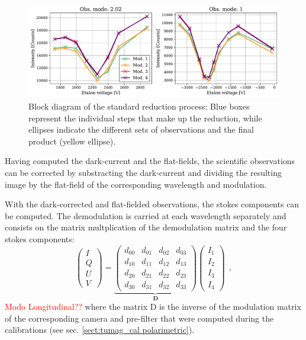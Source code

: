 \begin{figure}[t]
  \includegraphics[width=\textwidth]{figures/Pipeline/Spectral_scans_ecample.pdf}
  \caption{
    Block diagram of the standard reduction process: Blue boxes represent the individual steps that make up the reduction, while ellipses indicate the different sets of observations and the final product (yellow ellipse). }
    \label{fig_pipeline: spectral_scans}
\end{figure}


Having computed the dark-current and the flat-fields, the scientific observations can be corrected by substracting the dark-current and dividing the resulting image by the flat-field of the corresponding wavelength and modulation. 

With the dark-corrected and flat-fielded observations, the stokes components can be computed. The demodulation is carried at each wavelength separately and consists on the matrix multplication of the demodulation matrix and the four stokes components:
\begin{equation}
  \begin{pmatrix}
  I \\
  Q \\
  U \\
  V
  \end{pmatrix} = 
  \underbrace{\begin{pmatrix} 
      d _ {00} & d _ {01} & d _ {02} & d _ {03} \\ 
      d _ {10} & d _ {11} & d _ {12} & d _ {13} \\
      d _ {20} & d _ {21} & d _ {22} & d _ {23} \\
      d _ {30} & d _ {31} & d _ {32} & d _ {33} 
  \end{pmatrix}}_ {\textbf{D}}
  \begin{pmatrix}
    I _ {1} \\
    I _ {2} \\
    I _ {3} \\
    I _ {4}
    \end{pmatrix} \ \ , 
    \label{pipeline: Demod}
\end{equation}
\textcolor{red}{Modo Longitudinal??}
where the matrix D is the inverse of the modulation matrix of the corresponding camera and pre-filter that were computed during the calibrations (see sec. \ref{sect:tumag_cal polarimetric}).

